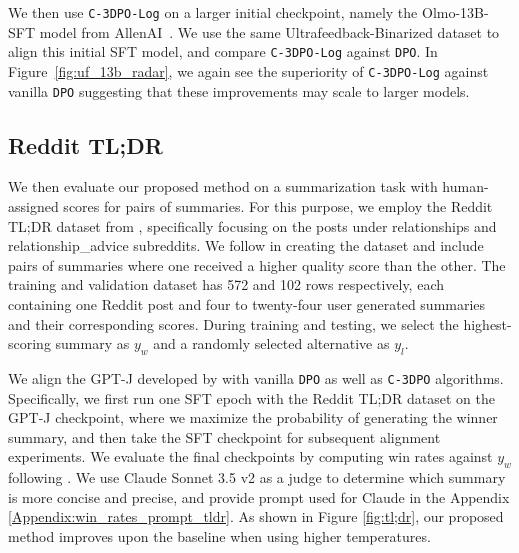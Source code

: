 We then use \texttt{C-3DPO-Log} on a larger initial checkpoint, namely the \textrm{Olmo-13B-SFT} model from AllenAI~\cite{olmo20242olmo2furious}. We use the same Ultrafeedback-Binarized dataset to align this initial SFT model, and compare \texttt{C-3DPO-Log} against \texttt{DPO}. In Figure~\ref{fig:uf_13b_radar}, we again see the superiority of \texttt{C-3DPO-Log} against vanilla \texttt{DPO} suggesting that these improvements may scale to larger models.

\subsection{\textrm{Reddit TL;DR}}
We then evaluate our proposed method on a summarization task with human-assigned scores for pairs of summaries. For this purpose, we employ the \textrm{Reddit TL;DR} dataset from \citet{reddit}, specifically focusing on the posts under relationships and relationship\_advice subreddits. We follow \citet{odpo} in creating the dataset and include pairs of summaries where one received a higher quality score than the other. The training and validation dataset has 572 and 102 rows respectively, each containing one Reddit post and four to twenty-four user generated summaries and their corresponding scores. During training and testing, we select the highest-scoring summary as $y_w$ and a randomly selected alternative as $y_l$.

We align the GPT-J developed by \citet{gpt-j} with vanilla \texttt{DPO} as well as \texttt{C-3DPO} algorithms. Specifically, we first run one SFT epoch with the \textrm{Reddit TL;DR} dataset on the GPT-J checkpoint, where we maximize the probability of generating the winner summary, and then take the SFT checkpoint for subsequent alignment experiments. We evaluate the final checkpoints by computing win rates against $y_w$ following \citet{DPO, odpo}. We use Claude Sonnet 3.5 v2 as a judge to determine which summary is more concise and precise, and provide prompt used for Claude in the Appendix \ref{Appendix:win_rates_prompt_tldr}. As shown in Figure \ref{fig:tl;dr}, our proposed method improves upon the baseline when using higher temperatures. 

